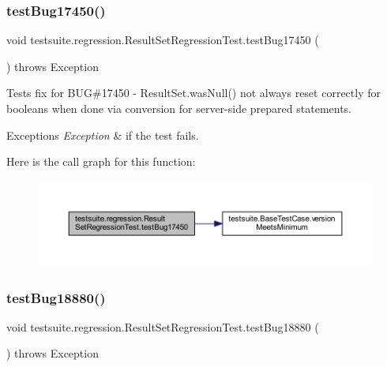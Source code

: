 \subsubsection{\texorpdfstring{test\+Bug17450()}{testBug17450()}}
{\footnotesize\ttfamily void testsuite.\+regression.\+Result\+Set\+Regression\+Test.\+test\+Bug17450 (\begin{DoxyParamCaption}{ }\end{DoxyParamCaption}) throws Exception}

Tests fix for B\+UG\#17450 -\/ Result\+Set.\+was\+Null() not always reset correctly for booleans when done via conversion for server-\/side prepared statements.


\begin{DoxyExceptions}{Exceptions}
{\em Exception} & if the test fails. \\
\hline
\end{DoxyExceptions}
Here is the call graph for this function\+:
\nopagebreak
\begin{figure}[H]
\begin{center}
\leavevmode
\includegraphics[width=350pt]{classtestsuite_1_1regression_1_1_result_set_regression_test_a3f4bf90b85397d484d4ca1e59e7700da_cgraph}
\end{center}
\end{figure}
\mbox{\label{classtestsuite_1_1regression_1_1_result_set_regression_test_a12e0f87612792e99392825bcd4cb8711}} 
\subsubsection{\texorpdfstring{test\+Bug18880()}{testBug18880()}}
{\footnotesize\ttfamily void testsuite.\+regression.\+Result\+Set\+Regression\+Test.\+test\+Bug18880 (\begin{DoxyParamCaption}{ }\end{DoxyParamCaption}) throws Exception}

